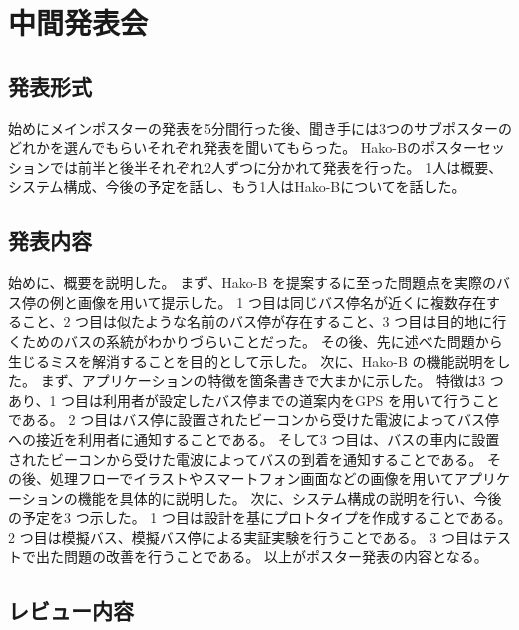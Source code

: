 \documentclass[openany,11pt,papersize]{jsbook}
\begin{document}

\section{中間発表会}
\subsection{発表形式}
始めにメインポスターの発表を5分間行った後、聞き手には3つのサブポスターのどれかを選んでもらいそれぞれ発表を聞いてもらった。
Hako-Bのポスターセッションでは前半と後半それぞれ2人ずつに分かれて発表を行った。
1人は概要、システム構成、今後の予定を話し、もう1人はHako-Bについてを話した。


\subsection{発表内容}
始めに、概要を説明した。
まず、Hako-B を提案するに至った問題点を実際のバス停の例と画像を用いて提示した。
1 つ目は同じバス停名が近くに複数存在すること、2 つ目は似たような名前のバス停が存在すること、3 つ目は目的地に行くためのバスの系統がわかりづらいことだった。
その後、先に述べた問題から生じるミスを解消することを目的として示した。
次に、Hako-B の機能説明をした。
まず、アプリケーションの特徴を箇条書きで大まかに示した。
特徴は3 つあり、1 つ目は利用者が設定したバス停までの道案内をGPS を用いて行うことである。
2 つ目はバス停に設置されたビーコンから受けた電波によってバス停への接近を利用者に通知することである。
そして3 つ目は、バスの車内に設置されたビーコンから受けた電波によってバスの到着を通知することである。
その後、処理フローでイラストやスマートフォン画面などの画像を用いてアプリケーションの機能を具体的に説明した。
次に、システム構成の説明を行い、今後の予定を3 つ示した。
1 つ目は設計を基にプロトタイプを作成することである。
2 つ目は模擬バス、模擬バス停による実証実験を行うことである。
3 つ目はテストで出た問題の改善を行うことである。
以上がポスター発表の内容となる。


\subsection{レビュー内容}
\end{document}
